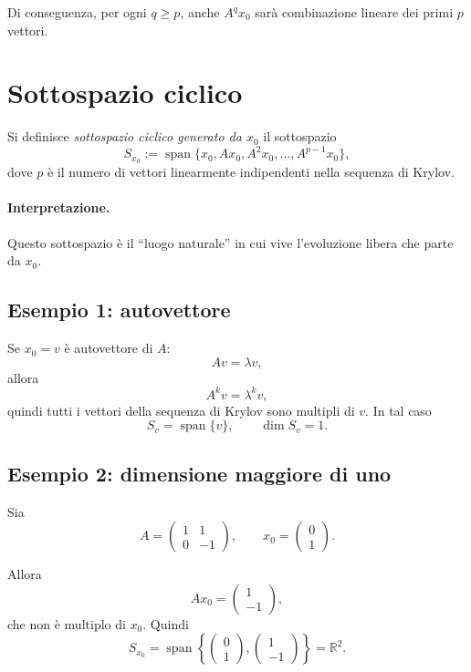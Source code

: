 Di conseguenza, per ogni $q\ge p$, anche $A^q x_0$ sarà combinazione lineare dei primi $p$ vettori.

\section{Sottospazio ciclico}

Si definisce \emph{sottospazio ciclico generato da $x_0$} il sottospazio
\begin{equation}
S_{x_0}:=\operatorname{span}\{x_0,Ax_0,A^2x_0,\dots,A^{p-1}x_0\},
\label{eq:L5_cyclic_subspace}
\end{equation}
dove $p$ è il numero di vettori linearmente indipendenti nella sequenza di Krylov.

\paragraph{Interpretazione.}
Questo sottospazio è il ``luogo naturale'' in cui vive l'evoluzione libera che parte da $x_0$.

\subsection{Esempio 1: autovettore}

Se $x_0=v$ è autovettore di $A$:
\[
Av=\lambda v,
\]
allora
\[
A^k v=\lambda^k v,
\]
quindi tutti i vettori della sequenza di Krylov sono multipli di $v$.  
In tal caso
\[
S_v=\operatorname{span}\{v\},
\qquad
\dim S_v=1.
\]

\subsection{Esempio 2: dimensione maggiore di uno}

Sia
\[
A=
\begin{pmatrix}
1 & 1\\
0 & -1
\end{pmatrix},
\qquad
x_0=
\begin{pmatrix}
0\\
1
\end{pmatrix}.
\]

Allora
\[
Ax_0=
\begin{pmatrix}
1\\
-1
\end{pmatrix},
\]
che non è multiplo di $x_0$. Quindi
\[
S_{x_0}=\operatorname{span}\left\{
\begin{pmatrix}
0\\1
\end{pmatrix},
\begin{pmatrix}
1\\-1
\end{pmatrix}
\right\}
=\mathbb{R}^2.
\]

